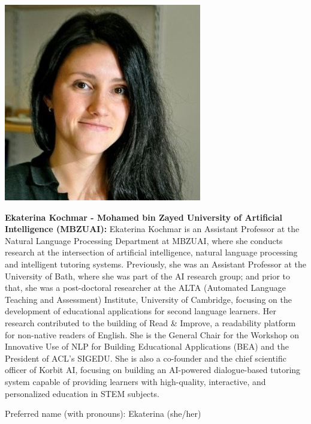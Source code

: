 \vspace{1em}
\begin{center}
\includegraphics[width=0.4\linewidth]{content/day2/ekaterina.png}
\end{center}
{\bfseries Ekaterina Kochmar - Mohamed bin Zayed University of Artificial Intelligence (MBZUAI):}
Ekaterina Kochmar is an Assistant Professor at the Natural Language Processing Department at MBZUAI, where she conducts research at the intersection of artificial intelligence, natural language processing and intelligent tutoring systems. Previously, she was an Assistant Professor at the University of Bath, where she was part of the AI research group; and prior to that, she was a post-doctoral researcher at the ALTA (Automated Language Teaching and Assessment) Institute, University of Cambridge, focusing on the development of educational applications for second language learners. Her research contributed to the building of Read \& Improve, a readability platform for non-native readers of English. She is the General Chair for the Workshop on Innovative Use of NLP for Building Educational Applications (BEA) and the President of ACL’s SIGEDU. She is also a co-founder and the chief scientific officer of Korbit AI, focusing on building an AI-powered dialogue-based tutoring system capable of providing learners with high-quality, interactive, and personalized education in STEM subjects.

Preferred name (with pronouns): Ekaterina (she/her)


\newpage
